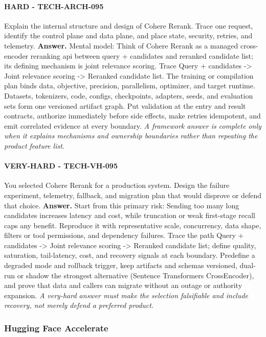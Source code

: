 \paragraph{HARD - TECH-ARCH-095} Explain the internal structure and design of Cohere Rerank. Trace one request, identify the control plane and data plane, and place state, security, retries, and telemetry.
\textbf{Answer.} Mental model: Think of Cohere Rerank as a managed cross-encoder reranking api between query + candidates and reranked candidate list; its defining mechanism is joint relevance scoring. Trace Query + candidates -> Joint relevance scoring -> Reranked candidate list. The training or compilation plan binds data, objective, precision, parallelism, optimizer, and target runtime. Datasets, tokenizers, code, configs, checkpoints, adapters, seeds, and evaluation sets form one versioned artifact graph. Put validation at the entry and result contracts, authorize immediately before side effects, make retries idempotent, and emit correlated evidence at every boundary.
\textit{A framework answer is complete only when it explains mechanisms and ownership boundaries rather than repeating the product feature list.}
\paragraph{VERY-HARD - TECH-VH-095} You selected Cohere Rerank for a production system. Design the failure experiment, telemetry, fallback, and migration plan that would disprove or defend that choice.
\textbf{Answer.} Start from this primary risk: Sending too many long candidates increases latency and cost, while truncation or weak first-stage recall caps any benefit. Reproduce it with representative scale, concurrency, data shape, filters or tool permissions, and dependency failures. Trace the path Query + candidates -> Joint relevance scoring -> Reranked candidate list; define quality, saturation, tail-latency, cost, and recovery signals at each boundary. Predefine a degraded mode and rollback trigger, keep artifacts and schemas versioned, dual-run or shadow the strongest alternative (Sentence Transformers CrossEncoder), and prove that data and callers can migrate without an outage or authority expansion.
\textit{A very-hard answer must make the selection falsifiable and include recovery, not merely defend a preferred product.}
\subsubsection*{Hugging Face Accelerate}
